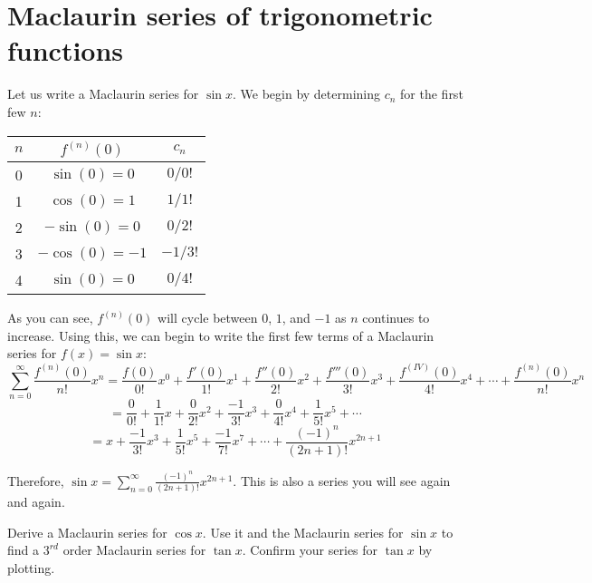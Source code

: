 \section{Maclaurin series of trigonometric functions}
Let us write a Maclaurin series for $\sin{x}$. We begin by determining $c_n$ 
for the first few $n$:
\begin{center}
	\begin{tabular}{|c|c|c|}\hline
	$n$ & $f^{(n)}(0)$ & $c_n$\\\hline
	0 & $\sin{(0)} = 0$ & $0/0!$\\\hline
	1 & $\cos{(0)} = 1$ & $1/1!$\\\hline
	2 & $-\sin{(0)} = 0$ & $0/2!$\\\hline
	3 & $-\cos{(0)} = -1$ & $-1/3!$\\\hline
	4 & $\sin{(0)} = 0$ & $0/4!$\\\hline
	\end{tabular}
\end{center}
As you can see, $f^{(n)}(0)$ will cycle between $0$, $1$, and $-1$ as $n$ 
continues to increase. Using this, we can begin to write the first few terms 
of a Maclaurin series for $f(x) = \sin{x}$:
$$\sum_{n=0}^\infty \frac{f^{(n)}(0)}{n!}x^n = \frac{f(0)}{0!}x^0 + \frac{f'(0)
}{1!}x^1 + \frac{f''(0)}{2!}x^2 + \frac{f'''(0)}{3!}x^3 + \frac{f^{(IV)}(0)}{4!
}x^4 + \cdots + \frac{f^{(n)}(0)}{n!}x^n$$
$$= \frac{0}{0!} + \frac{1}{1!}x + \frac{0}{2!}x^2 + \frac{-1}{3!}x^3 + \frac{0
}{4!}x^4 + \frac{1}{5!}x^5 + \cdots$$
$$=x + \frac{-1}{3!}x^3 + \frac{1}{5!}x^5 + \frac{-1}{7!}x^7 + \cdots + \frac{(
-1)^n}{(2n + 1)!}x^{2n+1}$$

Therefore, $\sin{x} = \sum_{n=0}^\infty \frac{(-1)^n}{(2n + 1)!}x^{2n + 1}$. 
This is also a series you will see again and again. 

\begin{Exercise}[label=trigmac]
Derive a Maclaurin series for $\cos{x}$. Use it and the Maclaurin series for 
$\sin{x}$ to find a $3^{rd}$ order Maclaurin series for $\tan{x}$. Confirm 
your series for $\tan{x}$ by plotting. 
\end{Exercise}

